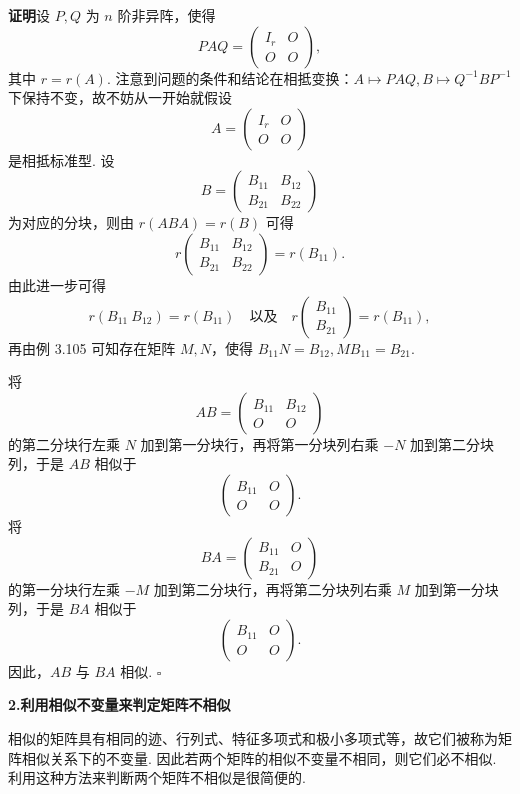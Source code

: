 \documentclass[UTF8,12pt,a4paper,fontset=fandol]{ctexart}
\begin{document}
\noindent\textbf{证明}\quad 设 $P,Q$ 为 $n$ 阶非异阵，使得
\[
PAQ=\left(\begin{array}{cc}
I_r & O\\
O & O
\end{array}\right),
\]
其中 $r=r(A)$. 注意到问题的条件和结论在相抵变换：$A\mapsto PAQ,B\mapsto Q^{-1}BP^{-1}$ 下保持不变，故不妨从一开始就假设
\[
A=\left(\begin{array}{cc}
I_r & O\\
O & O
\end{array}\right)
\]
是相抵标准型. 设
\[
B=\left(\begin{array}{cc}
B_{11} & B_{12}\\
B_{21} & B_{22}
\end{array}\right)
\]
为对应的分块，则由 $r(ABA)=r(B)$ 可得
\[
r\left(\begin{array}{cc}
B_{11} & B_{12}\\
B_{21} & B_{22}
\end{array}\right)=r(B_{11}).
\]
由此进一步可得
\[
r(B_{11}\ B_{12})=r(B_{11})\quad\text{以及}\quad
r\left(\begin{array}{c}
B_{11}\\
B_{21}
\end{array}\right)=r(B_{11}),
\]
再由例 3.105 可知存在矩阵 $M,N$，使得 $B_{11}N=B_{12},MB_{11}=B_{21}$.

将
\[
AB=\left(\begin{array}{cc}
B_{11} & B_{12}\\
O & O
\end{array}\right)
\]
的第二分块行左乘 $N$ 加到第一分块行，再将第一分块列右乘 $-N$ 加到第二分块列，于是 $AB$ 相似于
\[
\left(\begin{array}{cc}
B_{11} & O\\
O & O
\end{array}\right).
\]
将
\[
BA=\left(\begin{array}{cc}
B_{11} & O\\
B_{21} & O
\end{array}\right)
\]
的第一分块行左乘 $-M$ 加到第二分块行，再将第二分块列右乘 $M$ 加到第一分块列，于是 $BA$ 相似于
\[
\left(\begin{array}{cc}
B_{11} & O\\
O & O
\end{array}\right).
\]
因此，$AB$ 与 $BA$ 相似. $\square$

\noindent\textbf{2.\quad 利用相似不变量来判定矩阵不相似}

相似的矩阵具有相同的迹、行列式、特征多项式和极小多项式等，故它们被称为矩阵相似关系下的不变量. 因此若两个矩阵的相似不变量不相同，则它们必不相似. 利用这种方法来判断两个矩阵不相似是很简便的.
\end{document}
